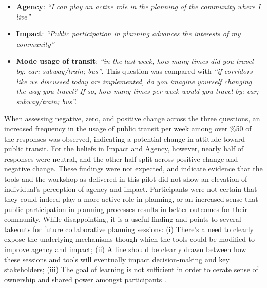 {{{            \begin{itemize}
                \item \textbf{Agency}: \textit{``I can play an active role in the planning of the community where I live''}
                \item \textbf{Impact}: \textit{``Public participation in planning advances the interests of my community''}
                \item \textbf{Mode usage of transit}: \textit{``in the last week, how many times did you travel by: car; subway/train; bus''}. This question was compared with \textit{``if corridors like we discussed today are implemented, do you imagine yourself changing the way you travel? If so, how many times per week would you travel by: car; subway/train; bus''.}
            \end{itemize}

            When assessing negative, zero, and positive change across the three questions, an increased frequency in the usage of public transit per week among over \%50 of the responses was observed, indicating a potential change in attitude toward public transit. For the beliefs in Impact and Agency, however, nearly half of responses were neutral, and the other half split across positive change and negative change. These findings were not expected, and indicate evidence that the tools and the workshop as delivered in this pilot did not show an elevation of individual's perception of agency and impact. Participants were not certain that they could indeed play a more active role in planning, or an increased sense that public participation in planning processes results in better outcomes for their community. While disappointing, it is a useful finding and points to several takeouts for future collaborative planning sessions: (i) There's a need to clearly expose the underlying mechanisms though which the tools could be modified to improve agency and impact; (ii) A line should be clearly drawn between how these sessions and tools will eventually impact decision-making and key stakeholders; (iii) The goal of learning is not sufficient in order to cerate sense of ownership and shared power amongst participants \cite{arnstein1969ladder, innes2010planning, Innes2016}.
        }

}}
